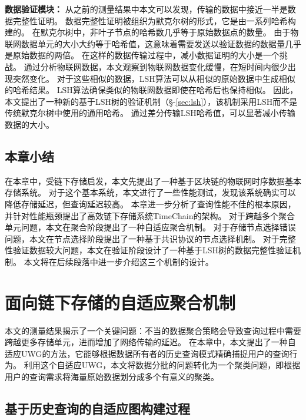 \textbf{数据验证模块：}
从之前的测量结果中本文可以发现，传输的数据中接近一半是数据完整性证明。
数据完整性证明被组织为默克尔树的形式，它是由一系列哈希构建的。
在默克尔树中，非叶子节点的哈希数几乎等于原始数据点的数量。
由于物联网数据单元的大小大约等于哈希值，这意味着需要发送以验证数据的数据量几乎是原始数据的两倍。
在这样的数据传输过程中，减小数据证明的大小是一个挑战。
通过分析物联网数据，本文观察到物联网数据变化缓慢，在短时间内很少出现突然变化。
对于这些相似的数据，LSH算法可以从相似的原始数据中生成相似的哈希结果。
LSH算法确保类似的物联网数据即使在哈希后也保持相似。
因此，本文提出了一种新的基于LSH树的验证机制（§-\autoref{sec:lsh}），该机制采用LSH而不是传统默克尔树中使用的通用哈希。
通过差分传输LSH哈希值，可以显著减小传输数据的大小。

\section{本章小结}
在本章中，受链下存储启发，本文先提出了一种基于区块链的物联网时序数据基本存储系统。
对于这个基本系统，本文进行了一些性能测试，发现该系统确实可以降低存储延迟，但查询延迟较高。
本章进一步分析了查询性能不佳的根本原因，并针对性能瓶颈提出了高效链下存储系统TimeChain的架构。
对于跨越多个聚合单元问题，本文在聚合阶段提出了一种自适应聚合机制。
对于存储节点选择错误问题，本文在节点选择阶段提出了一种基于共识协议的节点选择机制。
对于完整性验证数据较大问题，本文在验证阶段设计了一种基于LSH树的数据完整性验证机制。
本文将在后续段落中进一步介绍这三个机制的设计。

\chapter{面向链下存储的自适应聚合机制}
\label{sec:packaging}
本文的测量结果揭示了一个关键问题：不当的数据聚合策略会导致查询过程中需要跨越更多存储单元，进而增加了网络传输的延迟。
在本章中，本文提出了一种自适应UWG的方法，它能够根据数据所有者的历史查询模式精确捕捉用户的查询行为。
利用这个自适应UWG，本文将数据分批的问题转化为一个聚类问题，即根据用户的查询需求将海量原始数据划分成多个有意义的聚类。

\section{基于历史查询的自适应图构建过程}
\label{sec:UWG}

